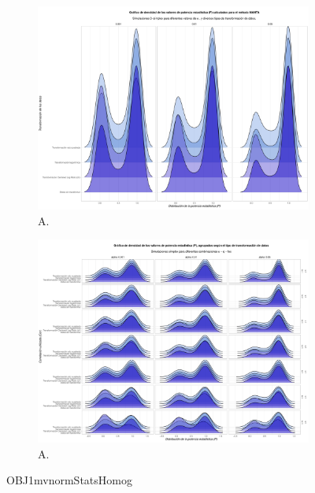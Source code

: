 \documentclass[IB,BIB]{TFUOC}%
\begin{document}
\begin{figure}
\centering
\begin{subfigure}{0.49\textwidth}
\centering
\includegraphics[width = \textwidth]{OBJ2SimplexStatswrapAlpha.pdf}
    \caption{\scriptsize{A.}}
    \label{fig:OBJ2SimplexStatswrapAlpha}
\end{subfigure}
\begin{subfigure}{0.49\textwidth}
\centering
\includegraphics[width = \textwidth]{OBJ2SimplexStatsGridqloc.pdf}
    \caption{\scriptsize{A.}}
    \label{fig:OBJ2SimplexStatsGridqloc}
\end{subfigure}
\caption{OBJ1mvnormStatsHomog}
\label{fig:OBJ1mvnormStatsHomog}
\end{figure}
\end{document}

